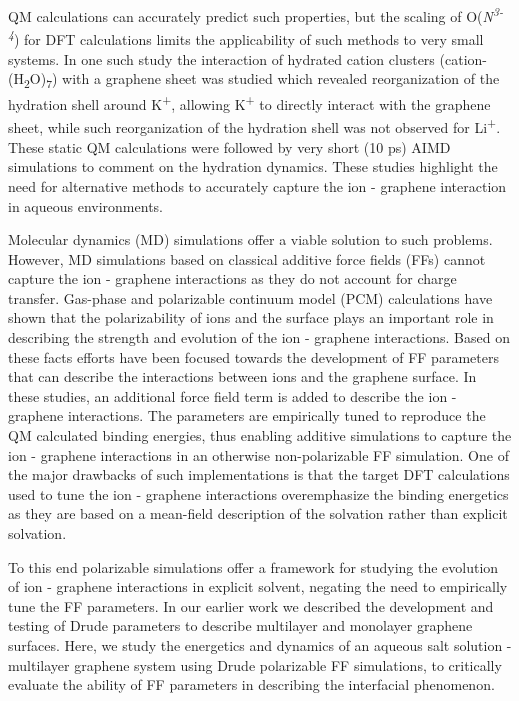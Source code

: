 QM calculations can accurately predict such properties, but the scaling of O(\textit{N\textsuperscript{3-4}}) for DFT calculations limits the applicability of such methods to very small systems.\supercite{mu_hydrated_2021} In one such study the interaction of hydrated cation clusters (cation-(H\textsubscript{2}O)\textsubscript{7}) with a graphene sheet was studied which revealed reorganization of the hydration shell around K\textsuperscript{+}, allowing K\textsuperscript{+} to directly interact with the graphene sheet, while such reorganization of the hydration shell was not observed for Li\textsuperscript{+}.\supercite{mu_hydrated_2021} These static QM calculations were followed by very short (10 ps) AIMD simulations to comment on the hydration dynamics.\supercite{mu_hydrated_2021,li_unraveling_2015} These studies highlight the need for alternative methods to accurately capture the ion - graphene interaction in aqueous environments.

Molecular dynamics (MD) simulations offer a viable solution to such problems. However, MD simulations based on classical additive force fields (FFs) cannot capture the ion - graphene interactions as they do not account for charge transfer. Gas-phase and polarizable continuum model (PCM) calculations have shown that the polarizability of ions and the surface plays an important role in describing the strength and evolution of the ion - graphene interactions.\supercite{sunner_ion-solvent_1981,zhou_deciphering_2020} Based on these facts efforts have been focused towards the development of FF parameters that can describe the interactions between ions and the graphene surface.\supercite{williams_effective_2017,chen_multiscale_2018} In these studies, an additional force field term is added to describe the ion - graphene interactions. The parameters are empirically tuned to reproduce the QM calculated binding energies, thus enabling additive simulations to capture the ion - graphene interactions in an otherwise non-polarizable FF simulation.\supercite{williams_effective_2017,chen_multiscale_2018} One of the major drawbacks of such implementations is that the target DFT calculations used to tune the ion - graphene interactions overemphasize the binding energetics as they are based on a mean-field description of the solvation rather than explicit solvation.

To this end polarizable simulations offer a framework for studying the evolution of ion - graphene interactions in explicit solvent, negating the need to empirically tune the FF parameters.\supercite{lin_polarizable_2018,h_polarization_2021}  In our earlier work we described the development and testing of Drude parameters to describe multilayer and monolayer graphene surfaces.\supercite{h_polarization_2021,h_capturing_2022} Here, we study the energetics and dynamics of an aqueous salt solution - multilayer graphene system using Drude polarizable FF simulations, to critically evaluate the ability of FF parameters in describing the interfacial phenomenon.

